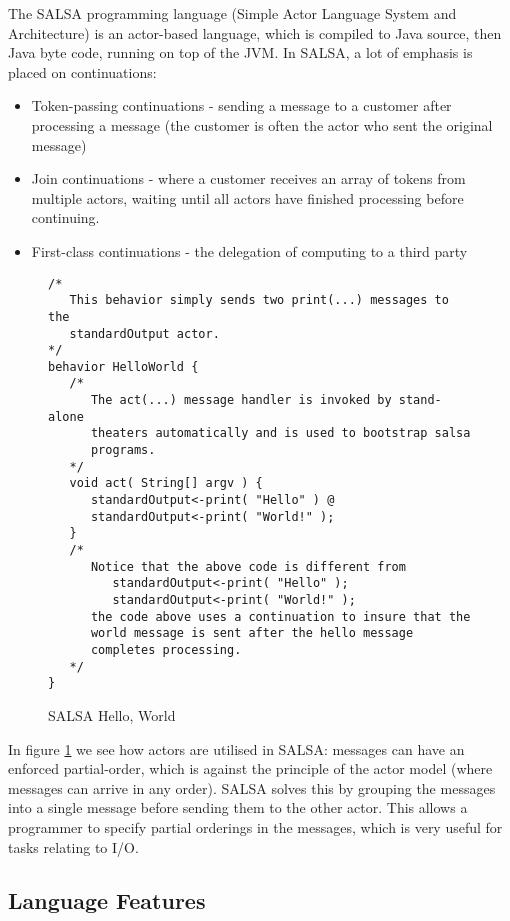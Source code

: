 \documentclass{article}
\begin{document}
The SALSA programming language (Simple Actor Language System and Architecture) is an actor-based language, which is compiled to Java source, then Java byte code, running on top of the JVM.
In SALSA, a lot of emphasis is placed on continuations:
\begin{itemize}[noitemsep]
	\item Token-passing continuations - sending a message to a customer after processing a message (the customer is often the actor who sent the original message)
	\item Join continuations - where a customer receives an array of tokens from multiple actors, waiting until all actors have finished processing before continuing.
	\item First-class continuations - the delegation of computing to a third party\cite{salsa-continuations}
\end{itemize}

\begin{figure}[H]
\begin{verbatim}
/*
   This behavior simply sends two print(...) messages to the 
   standardOutput actor.
*/
behavior HelloWorld {
   /*
      The act(...) message handler is invoked by stand-alone
      theaters automatically and is used to bootstrap salsa
      programs.
   */
   void act( String[] argv ) {
      standardOutput<-print( "Hello" ) @
      standardOutput<-print( "World!" );
   }
   /*
      Notice that the above code is different from 
         standardOutput<-print( "Hello" );
         standardOutput<-print( "World!" );
      the code above uses a continuation to insure that the 
      world message is sent after the hello message 
      completes processing.
   */
}
\end{verbatim}
\caption{SALSA Hello, World\cite{salsa-example}}
\label{fig:salsa-helloworld}
\end{figure}

In figure \ref{fig:salsa-helloworld} we see how actors are utilised in SALSA: messages can have an enforced partial-order, which is against the principle of the actor model (where messages can arrive in any order).
SALSA solves this by grouping the messages into a single message before sending them to the other actor.
This allows a programmer to specify partial orderings in the messages, which is very useful for tasks relating to I/O.

\subsection{Language Features}
\end{document}
